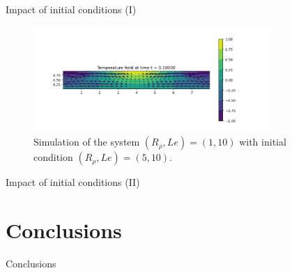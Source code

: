 \documentclass[10pt]{beamer}
\begin{document}
\begin{frame}{Impact of initial conditions (I)}
  \begin{figure}
    \centering
    \includegraphics[width=0.8\textwidth]{images/last_subsection/combination_temperature_temp_R_rho_5_to_1_prs_0_1.png}
    \caption{Simulation of the system $(R_{\rho},Le) = (1,10)$ with initial condition $(R_{\rho},Le) = (5,10)$.}
  \end{figure}
\end{frame}

\begin{frame}{Impact of initial conditions (II)}
    
\end{frame}
\section{Conclusions}

\begin{frame}{Conclusions}

\end{frame}
\end{document}
